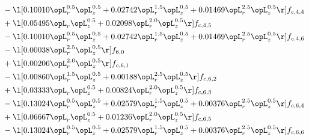 \begin{alignat}{2}
& - \l[  0.10010 \opL_r^{0.5} \opL_z^{0.5} +  0.02742 \opL_r^{1.5} \opL_z^{0.5} +  0.01469 \opL_r^{2.5} \opL_z^{0.5}  \r] f_{c,4,4} \nonumber \\ 
& + \l[  0.05495 \opL_r \opL_z^{0.5} +  0.02098 \opL_r^{2.0} \opL_z^{0.5}  \r] f_{c,4,5} \nonumber \\ 
& - \l[  0.10010 \opL_r^{0.5} \opL_z^{0.5} +  0.02742 \opL_r^{1.5} \opL_z^{0.5} +  0.01469 \opL_r^{2.5} \opL_z^{0.5}  \r] f_{c,4,6} \nonumber \\ 
& - \l[  0.00038 \opL_r^{2.5} \opL_z^{0.5}  \r] f_{6,0} \nonumber \\ 
& + \l[  0.00206 \opL_r^{2.0} \opL_z^{0.5}  \r] f_{c,6,1} \nonumber \\ 
& - \l[  0.00860 \opL_r^{1.5} \opL_z^{0.5} +  0.00188 \opL_r^{2.5} \opL_z^{0.5}  \r] f_{c,6,2} \nonumber \\ 
& + \l[  0.03333 \opL_r \opL_z^{0.5} +  0.00824 \opL_r^{2.0} \opL_z^{0.5}  \r] f_{c,6,3} \nonumber \\ 
& - \l[  0.13024 \opL_r^{0.5} \opL_z^{0.5} +  0.02579 \opL_r^{1.5} \opL_z^{0.5} +  0.00376 \opL_r^{2.5} \opL_z^{0.5}  \r] f_{c,6,4} \nonumber \\ 
& + \l[  0.06667 \opL_r \opL_z^{0.5} +  0.01236 \opL_r^{2.0} \opL_z^{0.5}  \r] f_{c,6,5} \nonumber \\ 
& - \l[  0.13024 \opL_r^{0.5} \opL_z^{0.5} +  0.02579 \opL_r^{1.5} \opL_z^{0.5} +  0.00376 \opL_r^{2.5} \opL_z^{0.5}  \r] f_{c,6,6} \nonumber \\ 
\end{alignat} 


